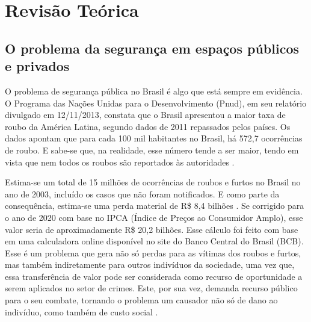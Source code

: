 \chapter{Revisão Teórica}
\label{cap:rev.teorica}
\thispagestyle{plain}
\graphicspath{{./Cap2_Revisao_Teorica/Figures/}}

\section{O problema da segurança em espaços públicos e privados}
O problema de segurança pública no Brasil é algo que está sempre em evidência. O Programa das Nações Unidas para o Desenvolvimento (Pnud), em seu relatório divulgado em 12/11/2013, constata que o Brasil apresentou a maior taxa de roubo da América Latina, segundo dados de 2011 repassados pelos países. Os dados apontam que para cada 100 mil habitantes no Brasil, há 572,7 ocorrências de roubo. E sabe-se que, na realidade, esse número tende a ser maior, tendo em vista que nem todos os roubos são reportados às autoridades \cite{G12013}.

Estima-se um total de 15 milhões de ocorrências de roubos e furtos no Brasil no ano de 2003, incluído os casos que não foram notificados. E como parte da consequência, estima-se uma perda material de R\$ 8,4 bilhões \cite{Cerqueira2007}. Se corrigido para o ano de 2020 com base no IPCA (Índice de Preços ao Consumidor Amplo), esse valor seria de aproximadamente R\$ 20,2 bilhões. Esse cálculo foi feito com base em uma calculadora online disponível no site do Banco Central do Brasil (BCB). Esse é um problema que gera não só perdas para as vítimas dos roubos e furtos, mas também indiretamente para outros indivíduos da sociedade, uma vez que, essa transferência de valor pode ser considerada como recurso de oportunidade a serem aplicados no setor de crimes. Este, por sua vez, demanda recurso público para o seu combate, tornando o problema um causador não só de dano ao indivíduo, como também de custo social \cite{Anderson1999, Cerqueira2007}.

